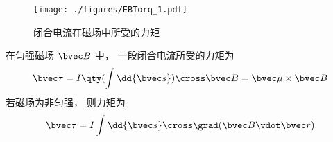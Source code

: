 
\begin{figure}[ht]
\centering
\texttt{[image: ./figures/EBTorq\_1.pdf]}
\caption{闭合电流在磁场中所受的力矩} \label{EBTorq_fig1}
\end{figure}

在匀强磁场 $\bvec B$ 中， 一段闭合电流所受的力矩为
\begin{equation}\label{EBTorq_eq2}
\bvec \tau = I \qty(\int \dd{\bvec s}) \cross \bvec B = \bvec \mu \times \bvec B
\end{equation}
若磁场为非匀强， 则力矩为
\begin{equation}\label{EBTorq_eq1}
\bvec \tau = I \int \dd{\bvec s}\cross\grad(\bvec B\vdot\bvec r)
\end{equation}


